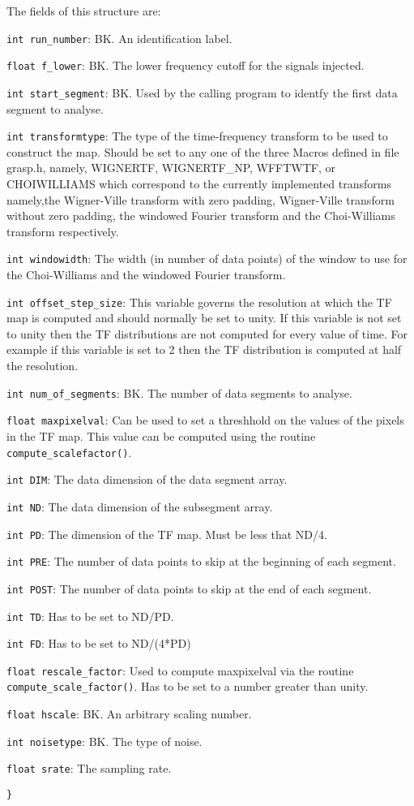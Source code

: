 The fields of this structure are:\\
\begin{description}
\item {\tt int run\_number}: BK. An identification label. 
\item {\tt float f\_lower}: BK. The lower frequency cutoff for the
signals injected. 
\item {\tt int start\_segment}: BK. Used by the calling program to
identfy the first data segment to analyse.
\item {\tt int transformtype}: The type of the time-frequency
transform to be used to construct the map. Should be set to any one of
the three Macros defined in file grasp.h, namely, WIGNERTF,
WIGNERTF\_NP, WFFTWTF,
or CHOIWILLIAMS which correspond to the  
currently implemented transforms namely,the Wigner-Ville transform
with zero padding, Wigner-Ville transform without zero padding,
the windowed Fourier transform and  the Choi-Williams transform
respectively.
\item {\tt int windowidth}: The width (in number of  data points) 
of the window to use for the Choi-Williams and the windowed Fourier transform.
\item {\tt int offset\_step\_size}: 
This variable governs the resolution at which the TF map is computed
and should normally be
set to unity. If this variable is not set to unity then the
TF distributions are not computed for every value of time. For
example if this variable is set to 2 then the TF
distribution is computed at half the resolution.
\item {\tt int num\_of\_segments}: BK. The number of data segments to analyse. 
\item {\tt float maxpixelval}: Can be used to set a threshhold on
the values of the pixels in the TF map. This value can  be
computed using the routine {\tt compute\_scalefactor()}.
\item {\tt int DIM}: The data dimension of the data segment array.
\item {\tt int ND}: The data dimension of the subsegment array.
\item {\tt int PD}: The dimension of the TF map. Must be less that
ND/4.
\item {\tt int PRE}: The number of data points to skip at the beginning
of each segment. 
\item {\tt int POST}: The number of data points to skip at the end
of each segment.
\item {\tt int TD}: Has to be set to  ND/PD. 
\item {\tt int FD}: Has to be set to  ND/(4*PD)
\item {\tt float rescale\_factor}:  Used to compute maxpixelval via the routine 
{\tt compute\_scale\_factor()}. Has to be set to a number
greater than unity.
\item {\tt float hscale}: BK. An arbitrary scaling number. 
\item {\tt int noisetype}: BK. The type of noise. 
\item {\tt float srate}: The sampling rate.
\end{description}
{\tt \}}


